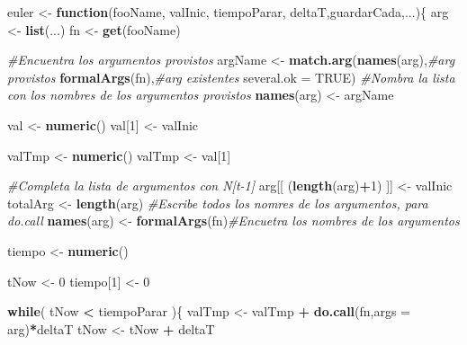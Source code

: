 \documentclass[12pt,letterpaper,]{book}
\newenvironment{Shaded}{\begin{snugshade}}{\end{snugshade}}
\newcommand{\KeywordTok}[1]{\textcolor[rgb]{0.13,0.29,0.53}{\textbf{#1}}}
\newcommand{\DataTypeTok}[1]{\textcolor[rgb]{0.13,0.29,0.53}{#1}}
\newcommand{\DecValTok}[1]{\textcolor[rgb]{0.00,0.00,0.81}{#1}}
\newcommand{\StringTok}[1]{\textcolor[rgb]{0.31,0.60,0.02}{#1}}
\newcommand{\CommentTok}[1]{\textcolor[rgb]{0.56,0.35,0.01}{\textit{#1}}}
\newcommand{\OtherTok}[1]{\textcolor[rgb]{0.56,0.35,0.01}{#1}}
\newcommand{\ControlFlowTok}[1]{\textcolor[rgb]{0.13,0.29,0.53}{\textbf{#1}}}
\newcommand{\OperatorTok}[1]{\textcolor[rgb]{0.81,0.36,0.00}{\textbf{#1}}}
\newcommand{\NormalTok}[1]{#1}
\begin{document}
\begin{Shaded}
\begin{Highlighting}[]
\NormalTok{euler <-}\StringTok{ }\ControlFlowTok{function}\NormalTok{(fooName, valInic, tiempoParar, deltaT,guardarCada,...)\{}
\NormalTok{  arg <-}\StringTok{ }\KeywordTok{list}\NormalTok{(...)}
\NormalTok{  fn <-}\StringTok{ }\KeywordTok{get}\NormalTok{(fooName)}
  
  \CommentTok{#Encuentra los argumentos provistos}
\NormalTok{  argName <-}\StringTok{ }\KeywordTok{match.arg}\NormalTok{(}\KeywordTok{names}\NormalTok{(arg),}\CommentTok{#arg provistos}
                       \KeywordTok{formalArgs}\NormalTok{(fn),}\CommentTok{#arg existentes}
                       \DataTypeTok{several.ok =} \OtherTok{TRUE}\NormalTok{)}
  \CommentTok{#Nombra la lista con los nombres de los argumentos provistos}
  \KeywordTok{names}\NormalTok{(arg) <-}\StringTok{ }\NormalTok{argName}
  
\NormalTok{  val <-}\StringTok{ }\KeywordTok{numeric}\NormalTok{()}
\NormalTok{  val[}\DecValTok{1}\NormalTok{] <-}\StringTok{ }\NormalTok{valInic}
  
\NormalTok{  valTmp <-}\StringTok{ }\KeywordTok{numeric}\NormalTok{()}
\NormalTok{  valTmp <-}\StringTok{ }\NormalTok{val[}\DecValTok{1}\NormalTok{]}
  
  \CommentTok{#Completa la lista de argumentos con N[t-1]}
\NormalTok{  arg[[ (}\KeywordTok{length}\NormalTok{(arg)}\OperatorTok{+}\DecValTok{1}\NormalTok{) ]] <-}\StringTok{ }\NormalTok{valInic}
\NormalTok{  totalArg <-}\StringTok{ }\KeywordTok{length}\NormalTok{(arg)}
  \CommentTok{#Escribe todos los nomres de los argumentos, para do.call}
  \KeywordTok{names}\NormalTok{(arg) <-}\StringTok{ }\KeywordTok{formalArgs}\NormalTok{(fn)}\CommentTok{#Encuetra los nombres de los argumentos}
  
\NormalTok{  tiempo <-}\StringTok{ }\KeywordTok{numeric}\NormalTok{()}
  
\NormalTok{  tNow <-}\StringTok{ }\DecValTok{0}
\NormalTok{  tiempo[}\DecValTok{1}\NormalTok{] <-}\StringTok{ }\DecValTok{0}
  
  \ControlFlowTok{while}\NormalTok{( tNow }\OperatorTok{<}\StringTok{ }\NormalTok{tiempoParar )\{}
\NormalTok{    valTmp <-}\StringTok{ }\NormalTok{valTmp }\OperatorTok{+}\StringTok{ }\KeywordTok{do.call}\NormalTok{(fn,}\DataTypeTok{args =}\NormalTok{ arg)}\OperatorTok{*}\NormalTok{deltaT}
\NormalTok{    tNow <-}\StringTok{ }\NormalTok{tNow }\OperatorTok{+}\StringTok{ }\NormalTok{deltaT }
      

\end{Highlighting}
\end{Shaded}
\end{document}
